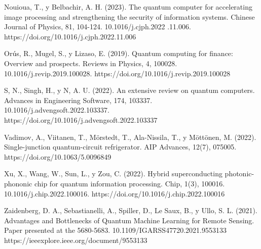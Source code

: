 \documentclass[twoside]{article}
\begin{document}
Nouioua, T., y Belbachir, A. H. (2023). The quantum computer for accelerating image processing and strengthening the security of information systems. Chinese Journal of Physics, 81, 104-124. 10.1016/j.cjph.2022
.11.006. 
https://doi.org/10.1016/j.cjph.2022.11.006

Orús, R., Mugel, S., y Lizaso, E. (2019). Quantum computing for finance: Overview and prospects. Reviews in Physics, 4, 100028. 10.1016/j.revip.2019.100028.
https://doi.org/10.1016/j.revip.2019.100028

S, N., Singh, H., y N, A. U. (2022). An extensive review on quantum computers. Advances in Engineering Software, 174, 103337. 10.1016/j.advengsoft.2022.103337.
https://doi.org/10.1016/j.advengsoft.2022.103337

Vadimov, A., Viitanen, T., Mörstedt, T., Ala-Nissila, T., y Möttönen, M. (2022). Single-junction quantum-circuit refrigerator. AIP Advances, 12(7), 075005. https://doi.org/10.1063/5.0096849

Xu, X., Wang, W., Sun, L., y Zou, C. (2022). Hybrid superconducting photonic-phononic chip for quantum information processing. Chip, 1(3), 100016. 10.1016/j.chip.2022.100016.
https://doi.org/10.1016/j.chip.2022.100016

Zaidenberg, D. A., Sebastianelli, A., Spiller, D., Le Saux, B., y Ullo, S. L. (2021).  Advantages and Bottlenecks of Quantum Machine Learning for Remote Sensing. Paper presented at the 5680-5683. 10.1109/IGARSS47720.2021.9553133 https://ieeexplore.ieee.org/document/9553133
\end{document}

